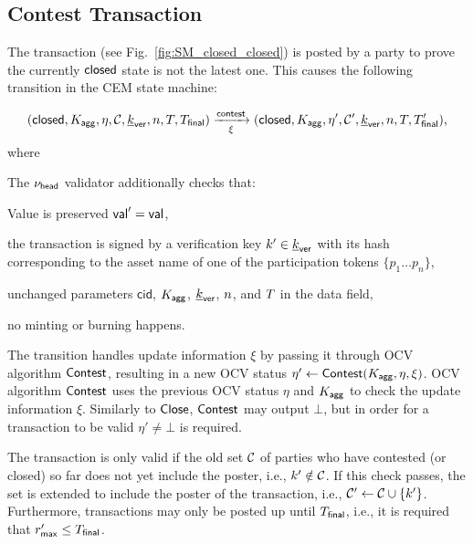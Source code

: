 


\subsection{Contest Transaction} 

The \mtxContest{} transaction (see
Fig.~\ref{fig:SM_closed_closed}) is posted by a party to prove the currently $\mathsf{closed}$ state is not the latest one. This causes the following transition in the CEM state machine:

$$
   (\mathsf{closed},K_{\mathsf{agg}},\eta,\mathcal{C},\underline{k}_{\mathsf{ver}},n,T,T_{\mathsf{final}}) \xrightarrow[\xi]{\mathsf{contest}} (\mathsf{closed},K_{\mathsf{agg}},\eta',\mathcal{C}', \underline{k}_{\mathsf{ver}},n,T,T_{\mathsf{final}}'),
$$
where
\begin{menumerate}
    \item 
\end{menumerate}

The $\nu_\mathsf{head}$ validator additionally checks that:
\begin{menumerate}
  \item Value is preserved $\mathsf{val}' = \mathsf{val}$,
  \item the transaction is signed by a verification key $k' \in \underline{k}_{\mathsf{ver}}$ with its
  hash corresponding to the asset name of one of the participation tokens
  $\{p_1 \dots p_n\}$,
  \item unchanged parameters $\mathsf{cid}$, $K_{\mathsf{agg}}$, $\underline{k}_{\mathsf{ver}}$, $n$, and
  $T$ in the data field,
  \item no minting or burning happens.
\end{menumerate}

The transition handles update
information $\xi$ by passing it through OCV algorithm $\mathsf{Contest}$,
resulting in a new OCV status
$\eta' \gets \mathsf{Contest} (K_{\mathsf{agg}},\eta,\xi)$.  OCV algorithm
$\mathsf{Contest}$ uses the previous OCV status $\eta$ and $K_{\mathsf{agg}}$ to check
the update information $\xi$.  Similarly to $\mathsf{Close}$, $\mathsf{Contest}$
may output $\bot$, but in order for a \mtxContest{} transaction to be
valid $\eta' \neq \bot$ is required.

The \mtxContest{} transaction is only valid if the old set
$\mathcal C$ of parties who have contested (or closed) so far does not yet
include the poster, i.e., $k' \notin \mathcal C$.  If this check
passes, the set is extended to include the poster of the \mtxContest{}
transaction, i.e., $\mathcal C' \gets \mathcal C \cup \{k'\}$.
Furthermore, \mtxContest{} transactions may only be posted up until
$T_{\mathsf{final}}$, i.e., it is required that $r_{\mathsf{max}}' \leq T_{\mathsf{final}}$.

